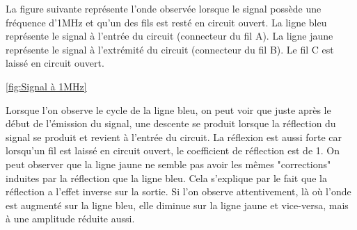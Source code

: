  La figure suivante représente l'onde observée lorsque le signal possède une fréquence d'1MHz et qu'un des fils est resté en circuit ouvert. La
 ligne bleu représente le signal à l'entrée du circuit (connecteur du fil A). La ligne jaune représente le signal à l'extrémité du circuit
 (connecteur du fil B). Le fil C est laissé en circuit ouvert.

\ref{fig:Signal à 1MHz}

Lorsque l'on observe le cycle de la ligne bleu, on peut voir que juste après le début de l'émission du signal, une descente se produit lorsque
la réflection du signal se produit et revient à l'entrée du circuit. La réflexion est aussi forte car lorsqu'un fil est laissé en circuit ouvert,
le coefficient de réflection est de 1. On peut observer que la ligne jaune ne semble pas avoir les mêmes "corrections" induites par la réflection
que la ligne bleu. Cela s'explique par le fait que la réflection a l'effet inverse sur la sortie. Si l'on observe attentivement, là où l'onde est
augmenté sur la ligne bleu, elle diminue sur la ligne jaune et vice-versa, mais à une amplitude réduite aussi.
